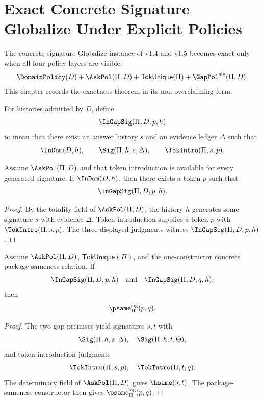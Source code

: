 \chapter{Exact Concrete Signature Globalize Under Explicit Policies}
\label{ch:v153-exact-concrete-globalize}

The concrete signature Globalize instance of v1.4 and v1.5 becomes exact only when all four policy layers are visible:
\[
  \DomainPolicy(D)
  +
  \AskPol(\Pi,D)
  +
  \mathsf{TokUnique}(\Pi)
  +
  \GapPol^{\mathrm{sig}}(\Pi,D).
\]
This chapter records the exactness theorem in its non-overclaiming form.

\begin{definition}
For histories admitted by \(D\), define
\[
  \InGapSig(\Pi,D,p,h)
\]
to mean that there exist an answer history \(s\) and an evidence ledger \(\Delta\) such that
\[
  \InDom(D,h),
  \qquad
  \Sig(\Pi,h,s,\Delta),
  \qquad
  \TokIntro(\Pi,s,p).
\]
\end{definition}

\begin{theorem}
\label{thm:v153-gap-coverage}
Assume \(\AskPol(\Pi,D)\) and that token introduction is available for every generated signature. If \(\InDom(D,h)\), then there exists a token \(p\) such that
\[
  \InGapSig(\Pi,D,p,h).
\]
\end{theorem}

\begin{proof}
By the totality field of \(\AskPol(\Pi,D)\), the history \(h\) generates some signature \(s\) with evidence \(\Delta\). Token introduction supplies a token \(p\) with \(\TokIntro(\Pi,s,p)\). The three displayed judgments witness \(\InGapSig(\Pi,D,p,h)\).
\end{proof}

\begin{theorem}
\label{thm:v153-gap-separation}
Assume \(\AskPol(\Pi,D)\), \(\mathsf{TokUnique}(\Pi)\), and the one-constructor concrete package-sameness relation. If
\[
  \InGapSig(\Pi,D,p,h)
  \quad\text{and}\quad
  \InGapSig(\Pi,D,q,h),
\]
then
\[
  \psame_{\Pi}^{\mathrm{sig}}(p,q).
\]
\end{theorem}

\begin{proof}
The two gap premises yield signatures \(s,t\) with
\[
  \Sig(\Pi,h,s,\Delta),\quad
  \Sig(\Pi,h,t,\Theta),
\]
and token-introduction judgments
\[
  \TokIntro(\Pi,s,p),\quad
  \TokIntro(\Pi,t,q).
\]
The determinacy field of \(\AskPol(\Pi,D)\) gives \(\hsame(s,t)\). The package-sameness constructor then gives \(\psame_{\Pi}^{\mathrm{sig}}(p,q)\).
\end{proof}

